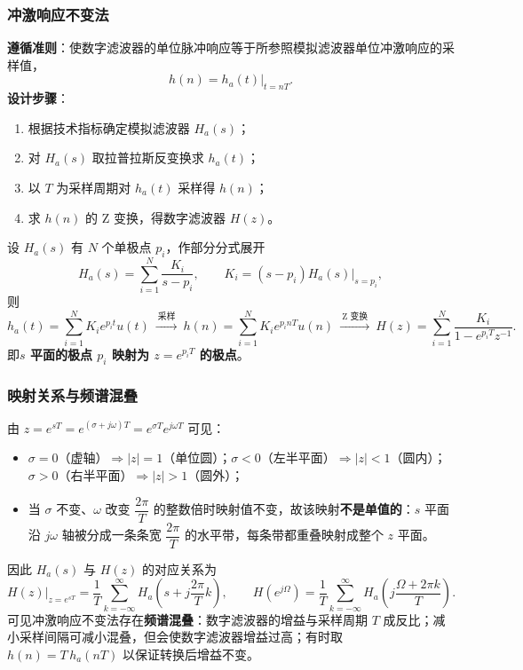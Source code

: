 \subsubsection{冲激响应不变法}
\textbf{遵循准则}：使数字滤波器的单位脉冲响应等于所参照模拟滤波器单位冲激响应的采样值，
\begin{equation}
h(n)=h_a(t)\Big|_{t=nT}.
\end{equation}
\textbf{设计步骤}：
\begin{enumerate}
\item 根据技术指标确定模拟滤波器 $H_a(s)$；
\item 对 $H_a(s)$ 取拉普拉斯反变换求 $h_a(t)$；
\item 以 $T$ 为采样周期对 $h_a(t)$ 采样得 $h(n)$；
\item 求 $h(n)$ 的 Z 变换，得数字滤波器 $H(z)$。
\end{enumerate}
设 $H_a(s)$ 有 $N$ 个单极点 $p_i$，作部分分式展开
\begin{equation}
H_a(s)=\sum_{i=1}^{N}\frac{K_i}{s-p_i},\qquad K_i=(s-p_i)H_a(s)\Big|_{s=p_i},
\end{equation}
则
\begin{equation}
h_a(t)=\sum_{i=1}^{N}K_i e^{p_it}u(t)\ \xrightarrow{\ \text{采样}\ }\
h(n)=\sum_{i=1}^{N}K_i e^{p_inT}u(n)\ \xrightarrow{\ \text{Z 变换}\ }\
H(z)=\sum_{i=1}^{N}\frac{K_i}{1-e^{p_iT}z^{-1}} .
\end{equation}
即\textbf{$s$ 平面的极点 $p_i$ 映射为 $z=e^{p_iT}$ 的极点}。

\subsubsection{映射关系与频谱混叠}
由 $z=e^{sT}=e^{(\sigma+j\omega)T}=e^{\sigma T}e^{j\omega T}$ 可见：
\begin{itemize}
\item $\sigma=0$（虚轴）$\Rightarrow |z|=1$（单位圆）；$\sigma<0$（左半平面）$\Rightarrow |z|<1$（圆内）；$\sigma>0$（右半平面）$\Rightarrow |z|>1$（圆外）；
\item 当 $\sigma$ 不变、$\omega$ 改变 $\dfrac{2\pi}{T}$ 的整数倍时映射值不变，故该映射\textbf{不是单值的}：$s$ 平面沿 $j\omega$ 轴被分成一条条宽 $\dfrac{2\pi}{T}$ 的水平带，每条带都重叠映射成整个 $z$ 平面。
\end{itemize}
因此 $H_a(s)$ 与 $H(z)$ 的对应关系为
\begin{equation}
H(z)\Big|_{z=e^{sT}}=\frac{1}{T}\sum_{k=-\infty}^{\infty}H_a\!\left(s+j\frac{2\pi}{T}k\right),
\qquad
H(e^{j\Omega})=\frac{1}{T}\sum_{k=-\infty}^{\infty}H_a\!\left(j\frac{\Omega+2\pi k}{T}\right).
\end{equation}
可见冲激响应不变法存在\textbf{频谱混叠}：数字滤波器的增益与采样周期 $T$ 成反比；减小采样间隔可减小混叠，但会使数字滤波器增益过高；有时取 $h(n)=T\,h_a(nT)$ 以保证转换后增益不变。


